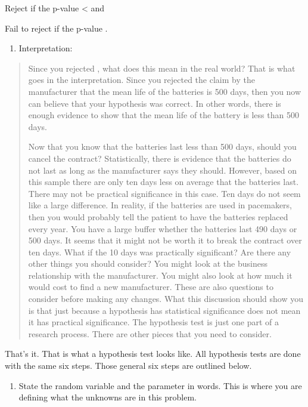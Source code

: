 \documentclass[]{book}
\providecommand{\tightlist}{%
  \setlength{\itemsep}{0pt}\setlength{\parskip}{0pt}}
\begin{document}
Reject if the p-value \textless{} and

Fail to reject if the p-value .

\begin{enumerate}
\def\labelenumi{\arabic{enumi}.}
\setcounter{enumi}{5}
\tightlist
\item
  Interpretation:
\end{enumerate}

\begin{quote}
Since you rejected , what does this mean in the real world? That is
what goes in the interpretation. Since you rejected the claim by the
manufacturer that the mean life of the batteries is 500 days, then you
now can believe that your hypothesis was correct. In other words,
there is enough evidence to show that the mean life of the battery is
less than 500 days.

Now that you know that the batteries last less than 500 days, should
you cancel the contract? Statistically, there is evidence that the
batteries do not last as long as the manufacturer says they should.
However, based on this sample there are only ten days less on average
that the batteries last. There may not be practical significance in
this case. Ten days do not seem like a large difference. In reality,
if the batteries are used in pacemakers, then you would probably tell
the patient to have the batteries replaced every year. You have a
large buffer whether the batteries last 490 days or 500 days. It seems
that it might not be worth it to break the contract over ten days.
What if the 10 days was practically significant? Are there any other
things you should consider? You might look at the business
relationship with the manufacturer. You might also look at how much it
would cost to find a new manufacturer. These are also questions to
consider before making any changes. What this discussion should show
you is that just because a hypothesis has statistical significance
does not mean it has practical significance. The hypothesis test is
just one part of a research process. There are other pieces that you
need to consider.
\end{quote}

That's it. That is what a hypothesis test looks like. All hypothesis
tests are done with the same six steps. Those general six steps are
outlined below.

\begin{enumerate}
\def\labelenumi{\arabic{enumi}.}
\tightlist
\item
  State the random variable and the parameter in words. This is where
  you are defining what the unknowns are in this problem.
\end{enumerate}
\end{document}
